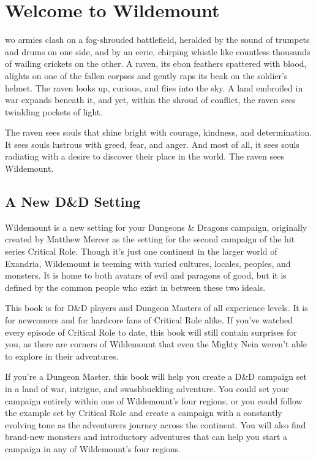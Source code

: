 \documentclass[10pt,a4paper,twoside,bg=print,twocolumn,openany,nodeprecatedcode]{dndbook}
\begin{document}
\chapter{Welcome to Wildemount}
\begin{DndReadAloud}{}
wo armies clash on a fog-shrouded battlefield, heralded by the sound of trumpets and drums on one side, and by an eerie, chirping whistle like countless thousands of wailing crickets on the other. A raven, its ebon feathers spattered with blood, alights on one of the fallen corpses and gently raps its beak on the soldier's helmet. The raven looks up, curious, and flies into the sky. A land embroiled in war expands beneath it, and yet, within the shroud of conflict, the raven sees twinkling pockets of light.


The raven sees souls that shine bright with courage, kindness, and determination. It sees souls lustrous with greed, fear, and anger. And most of all, it sees souls radiating with a desire to discover their place in the world. The raven sees Wildemount.

\end{DndReadAloud}

\section{A New D\&D Setting}
Wildemount is a new setting for your Dungeons \& Dragons campaign, originally created by Matthew Mercer as the setting for the second campaign of the hit series Critical Role. Though it's just one continent in the larger world of Exandria, Wildemount is teeming with varied cultures, locales, peoples, and monsters. It is home to both avatars of evil and paragons of good, but it is defined by the common people who exist in between these two ideals.

This book is for D\&D players and Dungeon Masters of all experience levels. It is for newcomers and for hardcore fans of Critical Role alike. If you've watched every episode of Critical Role to date, this book will still contain surprises for you, as there are corners of Wildemount that even the Mighty Nein weren't able to explore in their adventures.

If you're a Dungeon Master, this book will help you create a D\&D campaign set in a land of war, intrigue, and swashbuckling adventure. You could set your campaign entirely within one of Wildemount's four regions, or you could follow the example set by Critical Role and create a campaign with a constantly evolving tone as the adventurers journey across the continent. You will also find brand-new monsters and introductory adventures that can help you start a campaign in any of Wildemount's four regions.
\end{document}
